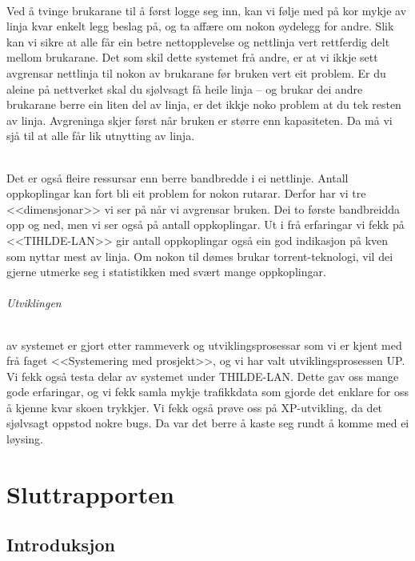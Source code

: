 \documentclass[nynorsk,12pt,a4paper,oneside]{book}
\begin{document}
\paragraph{}Ved å tvinge brukarane til å først logge seg inn, kan vi følje med på kor mykje av linja kvar enkelt legg beslag på, og ta affære om nokon øydelegg for andre. Slik kan vi sikre at alle får ein betre nettopplevelse og nettlinja vert rettferdig delt mellom brukarane. Det som skil dette systemet frå andre, er at vi ikkje sett avgrensar nettlinja til nokon av brukarane før bruken vert eit problem. Er du aleine på nettverket skal du sjølvsagt få heile linja -- og brukar dei andre brukarane berre ein liten del av linja, er det ikkje noko problem at du tek resten av linja. Avgreninga skjer først når bruken er større enn kapasiteten. Da må vi sjå til at alle får lik utnytting av linja. 
\paragraph{}Det er også fleire ressursar enn berre bandbredde i ei nettlinje. Antall oppkoplingar kan fort bli eit problem for nokon rutarar. Derfor har vi tre <<dimensjonar>> vi ser på når vi avgrensar bruken. Dei to første bandbreidda opp og ned, men vi ser også på antall oppkoplingar. Ut i frå erfaringar vi fekk på <<TIHLDE-LAN>> gir antall oppkoplingar også ein god indikasjon på kven som nyttar mest av linja. Om nokon til dømes brukar torrent-teknologi, vil dei gjerne utmerke seg i statistikken med svært mange oppkoplingar. 

\paragraph{Utviklingen} av systemet er gjort etter rammeverk og utviklingsprosessar som vi er kjent med frå faget <<Systemering med prosjekt>>, og vi har valt utviklingsprosessen UP. Vi fekk også testa delar av systemet under THILDE-LAN. Dette gav oss mange gode erfaringar, og vi fekk samla mykje trafikkdata som gjorde det enklare for oss å kjenne kvar skoen trykkjer. Vi fekk også prøve oss på XP-utvikling, da det sjølvsagt oppstod nokre bugs. Da var det berre å kaste seg rundt å komme med ei løysing. 

\tableofcontents
\mainmatter
\part{Sluttrapporten}
\chapter{Introduksjon}
\end{document}
